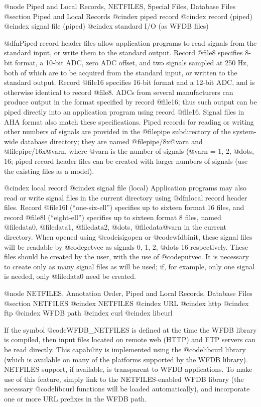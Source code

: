 {{{{{{{{{{{{{{@node     Piped and Local Records, NETFILES, Special Files, Database Files
@section Piped and Local Records
@cindex piped record
@cindex record (piped)
@cindex signal file (piped)
@cindex standard I/O (as WFDB files)

@dfn{Piped record} header files allow application programs to read signals from
the standard input, or write them to the standard output.  Record @file{8}
specifies 8-bit format, a 10-bit ADC, zero ADC offset, and two signals sampled
at 250 Hz, both of which are to be acquired from the standard input, or written
to the standard output.  Record @file{16} specifies 16-bit format and a 12-bit
ADC, and is otherwise identical to record @file{8}.  ADCs from several
manufacturers can produce output in the format specified by record @file{16};
thus such output can be piped directly into an application program using record
@file{16}.  Signal files in AHA format also match these specifications.  Piped
records for reading or writing other numbers of signals are provided in the
@file{pipe} subdirectory of the system-wide database directory; they are named
@file{pipe/8x@var{n}} and @file{pipe/16x@var{n}}, where @var{n} is the number
of signals (@var{n} = 1, 2, @dots{}, 16; piped record header files can be
created with larger numbers of signals (use the existing files as a model).

@cindex local record
@cindex signal file (local)
Application programs may also read or write signal files in the current
directory using @dfn{local record} header files.  Record
@file{16l} (``one-six-ell'') specifies up to sixteen format 16
files, and record @file{8l} (``eight-ell'') specifies up to
sixteen format 8 files, named @file{data0}, @file{data1},
@file{data2}, @dots{}, @file{data@var{n}} in the current directory.
When opened using @code{isigopen} or @code{wfdbinit}, these signal files
will be readable by @code{getvec} as signals 0, 1, 2, @dots{} 16
respectively.  These files should be created by the user, with the use
of @code{putvec}.  It is necessary to create only as many signal files
as will be used; if, for example, only one signal is needed, only
@file{data0} need be created.


@node     NETFILES, Annotation Order, Piped and Local Records, Database Files
@section NETFILES
@cindex NETFILES
@cindex URL
@cindex http
@cindex ftp
@cindex WFDB path
@cindex curl
@cindex libcurl

If the symbol @code{WFDB_NETFILES} is defined at the time the WFDB library is
compiled, then input files located on remote web (HTTP) and FTP servers can be
read directly.  This capability is implemented using the @code{libcurl} library
(which is available on many of the platforms supported by the WFDB library).
NETFILES support, if available, is transparent to WFDB applications.  To make
use of this feature, simply link to the NETFILES-enabled WFDB library (the
necessary @code{libcurl} functions will be loaded automatically), and
incorporate one or more URL prefixes in the WFDB path.

}}}}}}}}}}}}}}

